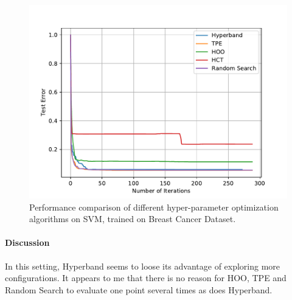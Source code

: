 \documentclass[twoside,11pt]{article}
\begin{document}
\begin{figure}[ht]
    \centering
    \includegraphics[scale=0.8]{img/uci/svm_1.pdf}
    \caption{Performance comparison of different hyper-parameter optimization algorithms on SVM, trained on Breast Cancer Dataset.}
    \label{svm_1}
\end{figure}

\paragraph{\textbf{Discussion}} In this setting, Hyperband seems to loose its advantage of exploring more configurations. It appears to me that there is no reason for HOO, TPE and Random Search to evaluate one point several times as does Hyperband.

\newpage
\vskip 0.2in



\end{document}
